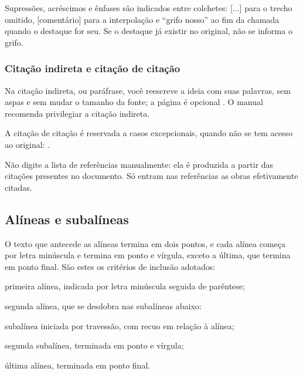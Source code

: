 Supressões, acréscimos e ênfases são indicados entre colchetes: [...] para
o trecho omitido, [comentário] para a interpolação e ``grifo nosso'' ao
fim da chamada quando o destaque for seu. Se o destaque já existir no
original, não se informa o grifo.

\subsubsection{Citação indireta e citação de citação}

Na citação indireta, ou paráfrase, você reescreve a ideia com suas
palavras, sem aspas e sem mudar o tamanho da fonte; a página é opcional
\cite{van86}. O manual recomenda privilegiar a citação indireta.

A citação de citação é reservada a casos excepcionais, quando não se tem
acesso ao original: .

Não digite a lista de referências manualmente: ela é produzida a partir das
citações presentes no documento. Só entram nas referências as obras
efetivamente citadas.

\subsection{Alíneas e subalíneas}

O texto que antecede as alíneas termina em dois pontos, e cada alínea
começa por letra minúscula e termina em ponto e vírgula, exceto a última,
que termina em ponto final. São estes os critérios de inclusão adotados:

\begin{alineas}
  \item primeira alínea, indicada por letra minúscula seguida de parêntese;
  \item segunda alínea, que se desdobra nas subalíneas abaixo:
  \begin{subalineas}
    \item subalínea iniciada por travessão, com recuo em relação à alínea;
    \item segunda subalínea, terminada em ponto e vírgula;
  \end{subalineas}
  \item última alínea, terminada em ponto final.
\end{alineas}

